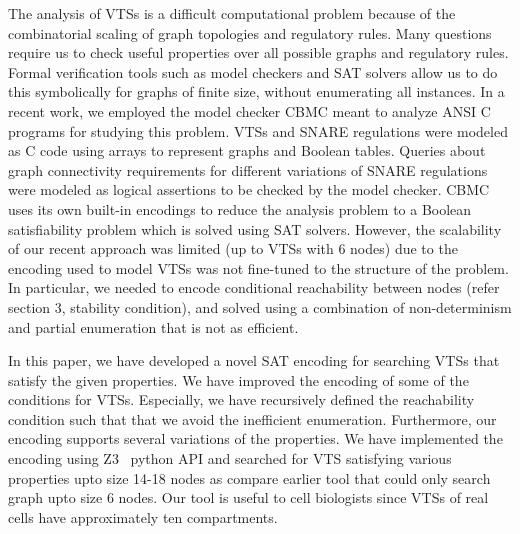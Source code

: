 The analysis of VTSs is a difficult computational problem because of the combinatorial scaling of graph topologies and regulatory rules. Many questions require us to check useful properties over all possible graphs and regulatory rules. Formal verification tools such as model checkers \cite{clarke1996symbolic, biere2003bounded, clarke2008birth, cimatti2000nusmv, holzmann1997model} and SAT solvers \cite{moskewicz2001chaff,een2004extensible} allow us to do this symbolically for graphs of finite size, without enumerating all instances. In a recent work, we employed the model checker CBMC \cite{CKY03, ckl2004} meant to analyze ANSI C programs for studying this problem. VTSs and SNARE regulations were modeled as C code using arrays to represent graphs and Boolean tables. Queries about graph connectivity requirements for different variations of SNARE regulations were modeled as logical assertions to be checked by the model checker. CBMC uses its own built-in encodings to reduce the analysis problem to a Boolean satisfiability problem which is solved using SAT solvers.
%
However, the scalability of our recent approach was limited (up to
VTSs with 6 nodes) due to the encoding used to model VTSs was not
fine-tuned to the structure of the problem.
%
In particular, we needed to encode conditional reachability between
nodes (refer section 3, stability condition), and solved using a
combination of non-determinism and partial enumeration that is not as
efficient.



In this paper, we have developed a novel SAT encoding for
searching VTSs that satisfy the given properties.
%
We have improved the encoding of some of the conditions for VTSs.
%
Especially, we have recursively defined the reachability condition
such that that we avoid the inefficient enumeration.
%
%
Furthermore, our encoding supports several variations of the properties.
%
We have implemented the encoding using Z3~\cite{z3} python API and
searched for VTS satisfying various properties upto size 14-18 nodes
as compare earlier tool that could only search graph upto size 6
nodes.
%
Our tool is useful to cell biologists since VTSs of real cells have
approximately ten compartments.

